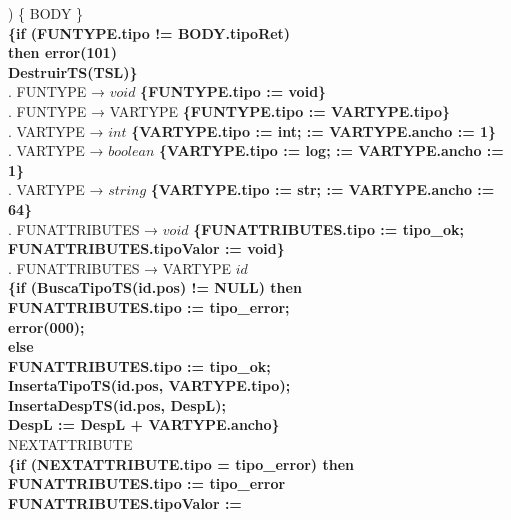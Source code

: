\begin{tabbing}
    \>              \>) \{ BODY \}\\
    \>              \> \textbf{\{if (FUNTYPE.tipo != BODY.tipoRet)}\\
    \>              \>          \> \textbf{then error(101)}\\
    \>              \> \textbf{DestruirTS(TSL)\}}\\
    . FUNTYPE → $void$ \textbf{\{FUNTYPE.tipo := void\}}\\
    . FUNTYPE → VARTYPE \textbf{\{FUNTYPE.tipo := VARTYPE.tipo\}}\\
    . VARTYPE → $int$ \textbf{\{VARTYPE.tipo := int; := VARTYPE.ancho := 1\}}\\
    . VARTYPE → $boolean$ \textbf{\{VARTYPE.tipo := log; := VARTYPE.ancho := 1\}}\\
    . VARTYPE → $string$ \textbf{\{VARTYPE.tipo := str; := VARTYPE.ancho := 64\}}\\
    . FUNATTRIBUTES → $void$ \textbf{\{FUNATTRIBUTES.tipo := tipo\_ok;}\\
    \>              \> \textbf{FUNATTRIBUTES.tipoValor := void\}}\\
    . FUNATTRIBUTES → VARTYPE $id$\\
    \>              \>          \> \textbf{\{if (BuscaTipoTS(id.pos) != NULL) then} \\
    \>              \>          \>      \>\textbf{FUNATTRIBUTES.tipo := tipo\_error;}\\
    \>              \>          \>      \>\textbf{error(000);}\\
    \>              \>          \> \textbf{ else}\\
    \>              \>          \>      \>\textbf{FUNATTRIBUTES.tipo := tipo\_ok;}\\
    \>              \>          \>      \>\textbf{InsertaTipoTS(id.pos, VARTYPE.tipo);}\\
    \>              \>          \>      \>\textbf{InsertaDespTS(id.pos, DespL);}\\
    \>              \>          \>      \>\textbf{DespL := DespL + VARTYPE.ancho\}}\\
    \>              \>NEXTATTRIBUTE\\
    \>              \>          \> \textbf{\{if (NEXTATTRIBUTE.tipo = tipo\_error) then}\\
    \>              \>          \>      \>\textbf{FUNATTRIBUTES.tipo := tipo\_error}\\
    \>              \>          \> \textbf{ FUNATTRIBUTES.tipoValor := }\\

\end{tabbing}
